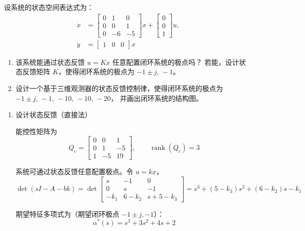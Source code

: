 \begin{example}
    设系统的状态空间表达式为：
    \[
    \begin{aligned}
    \dot{x}
    &=
    \begin{bmatrix}
    0 & 1 & 0 \\
    0 & 0 & 1 \\
    0 & -6 & -5
    \end{bmatrix}x
    +
    \begin{bmatrix}
    0 \\
    0 \\
    1
    \end{bmatrix}u, \\[4pt]
    y
    &=
    \begin{bmatrix}
    1 & 0 & 0
    \end{bmatrix}x
    \end{aligned}
    \]

    \begin{enumerate}
        \item 该系统能通过状态反馈 $u=Kx$ 任意配置闭环系统的极点吗？
        若能，设计状态反馈矩阵 $K$，使得闭环系统的极点为
        $-1 \pm j,\,-1$。

        \item 设计一个基于三维观测器的状态反馈控制律，使得闭环系统的极点为
        $-1 \pm j,\,-1,\,-10,\,-10,\,-20$，
        并画出闭环系统的结构图。
    \end{enumerate}
    \tcblower
    \begin{enumerate}
        \item 设计状态反馈（直接法）

        能控性矩阵为
        \[
        Q_c =
        \begin{bmatrix}
        0 & 0 & 1 \\
        0 & 1 & -5 \\
        1 & -5 & 19
        \end{bmatrix},
        \qquad
        \operatorname{rank}(Q_c)=3
        \]

        系统可通过状态反馈任意配置极点。令 $u=kx$，
        \[
        \det(sI-A-bk)
        =
        \det
        \begin{bmatrix}
        s & -1 & 0 \\
        0 & s & -1 \\
        -k_1 & 6-k_2 & s+5-k_3
        \end{bmatrix}
        =
        s^3+(5-k_3)s^2+(6-k_2)s-k_1
        \]

        期望特征多项式为（期望闭环极点 $-1\pm j,-1$）：
        \[
        \alpha^*(s)=s^3+3s^2+4s+2
        \]


\end{enumerate}
\end{example}
